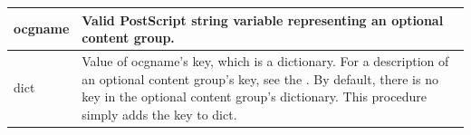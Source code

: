 \documentclass[letterpaper,12pt,english,openany,oneside]{sphinxmanual}
\begin{document}
\label{\detokenize{pdfmark_OC_Interface:syntax-7}}

\begin{sphinxVerbatim}[commandchars=\\\{\}]
  
\end{sphinxVerbatim}
\label{\detokenize{pdfmark_OC_Interface:parameters-5}}


\begin{savenotes}\sphinxattablestart
\centering
{}\label{\detokenize{pdfmark_OC_Interface:section-5}}\nobreak
\begin{tabulary}{\linewidth}[t]{|T|T|}
\hline

ocgname
&
Valid PostScript string variable representing an optional content group.
\\
\hline
dict
&
Value of ocgname’s  key, which is a dictionary. For a description of an optional content group’s  key, see the  . By default, there is no  key in the optional content group’s dictionary. This procedure simply adds the key to dict.
\\
\hline
\end{tabulary}
\par
\sphinxattableend\end{savenotes}
\label{\detokenize{pdfmark_OC_Interface:example-2}}

\begin{sphinxVerbatim}[commandchars=\\\{\}]
        
          
         
\end{sphinxVerbatim}
\end{document}

